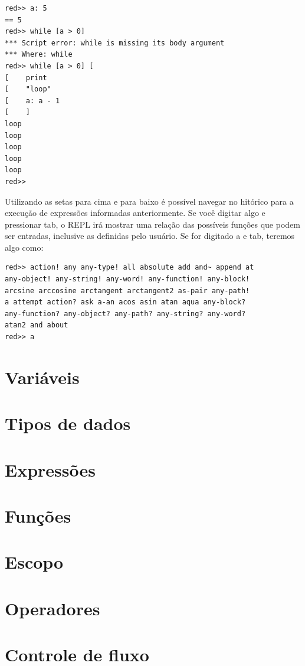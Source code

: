 \documentclass[12pt]{article}
\begin{document}
\begin{shaded}
\begin{verbatim}
red>> a: 5
== 5
red>> while [a > 0]
*** Script error: while is missing its body argument
*** Where: while
red>> while [a > 0] [
[    print
[    "loop"
[    a: a - 1
[    ]
loop
loop
loop
loop
loop
red>> 
\end{verbatim}
\end{shaded}

Utilizando as setas para cima e para baixo é possível navegar no hitórico para a
execução de expressões informadas anteriormente. Se você digitar algo e
pressionar tab, o REPL irá mostrar uma relação das possíveis funções que podem
ser entradas, inclusive as definidas pelo usuário. Se for digitado a e tab,
teremos algo como:

\begin{shaded}
\begin{verbatim}
red>> action! any any-type! all absolute add and~ append at
any-object! any-string! any-word! any-function! any-block! 
arcsine arccosine arctangent arctangent2 as-pair any-path! 
a attempt action? ask a-an acos asin atan aqua any-block? 
any-function? any-object? any-path? any-string? any-word? 
atan2 and about 
red>> a
\end{verbatim}
\end{shaded}


\section{Variáveis}
\section{Tipos de dados}
\section{Expressões}
\section{Funções}
\section{Escopo}
\section{Operadores}
\section{Controle de fluxo}
\end{document}
